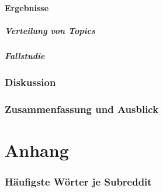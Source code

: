 \documentclass[11pt,a4paper,twoside]{article}
\begin{document}
\hypertarget{ergebnisse}{%
\subsection{Ergebnisse}\label{ergebnisse}}

\hypertarget{verteilung-von-topics}{%
\subsubsection{Verteilung von Topics}\label{verteilung-von-topics}}

\hypertarget{fallstudie}{%
\subsubsection{Fallstudie}\label{fallstudie}}

\cleardoublepage

\hypertarget{diskussion}{%
\section{Diskussion}\label{diskussion}}

\cleardoublepage

\hypertarget{zusammenfassung-und-ausblick}{%
\section{Zusammenfassung und
Ausblick}\label{zusammenfassung-und-ausblick}}

\cleardoublepage

\hypertarget{part-anhang}{%
\part*{Anhang}\label{part-anhang}}


\hypertarget{appendix-anhang}{%
\appendix}


\hypertarget{haufigste-worter-je-subreddit}{%
\section{Häufigste Wörter je
Subreddit}\label{haufigste-worter-je-subreddit}}
\end{document}
